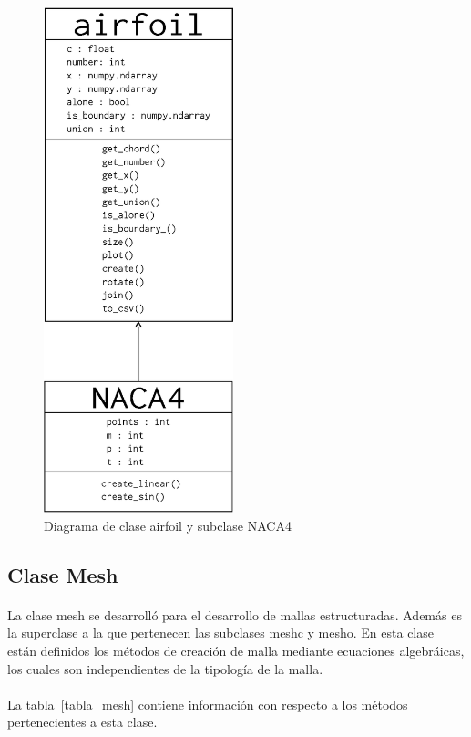 \documentclass[letterpaper, openright, 12pt]{book}
\begin{document}
    \begin{figure}[htbp!]
        \centering
        \includegraphics[keepaspectratio, width=55mm]{./Imagenes/airfoil_class}
        \caption[Diagrama de clase airfoil y subclase NACA4]{Diagrama de clase airfoil y subclase
        NACA4}
        \label{airfoil_class}
    \end{figure}


    \subsection{Clase Mesh}
    \paragraph*{}
        La clase mesh se desarrolló para el desarrollo de mallas estructuradas.
        Además es la superclase a la que pertenecen las subclases
        mesh\textunderscore c y mesh\textunderscore o. En esta clase están
        definidos los métodos de creación de malla mediante ecuaciones
        algebráicas, los cuales son independientes de la tipología de la malla.

    \paragraph*{}
        La tabla~\ref{tabla_mesh} contiene información con respecto a los
        métodos pertenecientes a esta clase.
\end{document}

